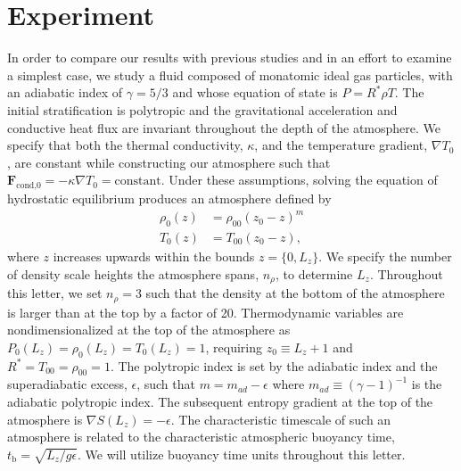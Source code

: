 \documentclass[aps, prl, twocolumn, groupedaddress, amsfonts, amssymb, amsmath]{revtex4-1}
\newcommand{\grad}{\ensuremath{\nabla}}
\begin{document}
\section{Experiment} 
\label{sec:experiment}
In order to compare our results with previous studies and in an effort to examine a simplest case,
we study a fluid composed of monatomic ideal gas particles, with an adiabatic index of $\gamma = 5/3$ and
whose equation of state is $P = R^*\rho T$. 
The initial stratification is polytropic and the gravitational
acceleration and conductive heat flux are invariant throughout the depth of the atmosphere. We specify that both 
the thermal conductivity, $\kappa$, and the temperature gradient, $\grad T_0$, are constant while constructing
our atmosphere such that $\bm{F}_{\text{cond,0}} = -\kappa \grad T_0 = \text{constant}$.
Under these assumptions, solving the equation of hydrostatic equilibrium produces an atmosphere defined by
\begin{equation}
\begin{split}
\rho_0(z) &= \rho_{00}(z_0 - z)^m \\
T_0(z)    &= T_{00}(z_0 - z),
\label{eqn:polytrope}
\end{split}
\end{equation}
where $z$ increases upwards within the bounds $z =\{0, L_{z}\}$.
We specify the number of density scale heights the atmosphere spans, $n_\rho$, to determine $L_{z}$. Throughout
this letter, we set $n_{\rho} = 3$ such that the density at the bottom of the atmosphere is larger
than at the top by a factor of 20.
Thermodynamic variables are nondimensionalized at the top of the atmosphere as 
$P_0(L_z) = \rho_0(L_z) = T_0(L_z) = 1$, requiring $z_0 \equiv L_z + 1$ and $R^* = T_{00} = \rho_{00} = 1$.  
The polytropic index is set by the adiabatic index and the
superadiabatic excess, $\epsilon$, such that $m = m_{ad} - \epsilon$
where $m_{ad} \equiv (\gamma-1)^{-1}$ is the adiabatic polytropic index.
The subsequent entropy gradient at the top of the atmosphere is $\grad S(L_z) = -\epsilon$.  
The characteristic timescale of such an
atmosphere is related to the characteristic atmospheric buoyancy time, $t_{\text{b}} = \sqrt{L_z/g\epsilon}$.
We will utilize buoyancy time units throughout this letter.
\end{document}
